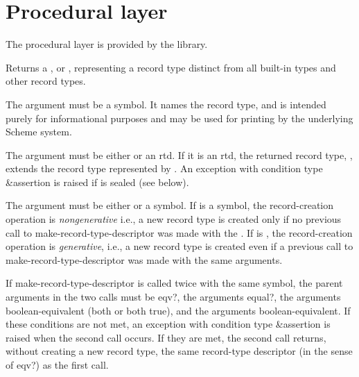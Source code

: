 \section{Procedural layer}
\label{recordsproceduralsection}

The procedural layer is provided by the  library.

\begin{entry}{%
}
   
Returns a , or ,
representing a record type distinct from all built-in types and
other record types.

The  argument must be a symbol. It names the record type,
and is intended purely for informational purposes and may be used for printing by
the underlying Scheme system.

The  argument must be either \schfalse{} or an rtd. If it is an
rtd, the returned record type, , extends the record type
 represented by .  An exception with
condition type {\cf\&assertion} is raised if  is sealed (see below).
   
The  argument must be either \schfalse{} or a symbol.
If  is a symbol, the record-creation operation is
\emph{nongenerative} i.e., a new record type is created only
if no previous call to {\cf make-record-type-descriptor}
was made with the .
If  is \schfalse{}, the record-creation operation is
\emph{generative}, i.e., a new record type is created even if
a previous call to {\cf make-record-type-descriptor} was
made with the same arguments.

If {\cf make-record-type-descriptor} is
called twice with the same  symbol, the parent
arguments in the two calls must be {\cf eqv?}, the 
arguments {\cf equal?}, the  arguments boolean-equivalent
(both \schfalse{} or both true), and the  arguments
boolean-equivalent.
If these conditions are not met, an exception with condition type
{\cf\&assertion} is raised when the second call occurs.
If they are met, the second call returns, without creating a new
record type, the same record-type descriptor
(in the sense of {\cf eqv?}) as the first call.


\end{entry}
